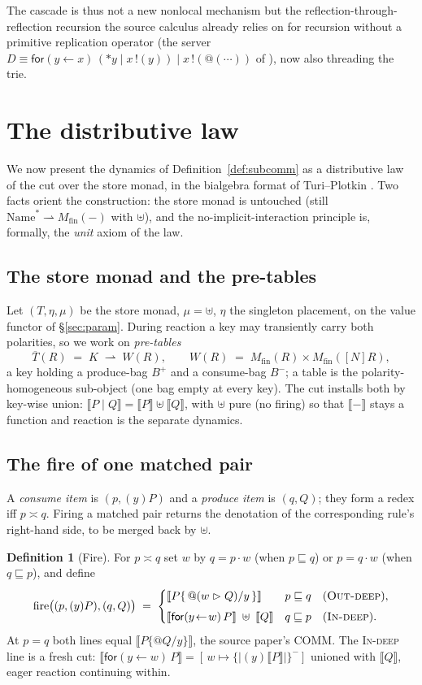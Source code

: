 \documentclass[11pt]{article}
\makeatletter
\theoremstyle{plain}
\theoremstyle{definition}
\newtheorem{definition}{Definition}
\newcommand{\den}[1]{\llbracket #1 \rrbracket}
\newcommand{\Name}{\mathrm{Name}}
\newcommand{\Mfin}{M_{\mathrm{fin}}}
\newcommand{\rfor}[2]{\mathsf{for}(#1\!\leftarrow\!#2)\,}
\newcommand{\rout}[2]{#1\,!(#2)}
\newcommand{\comp}{\mathrel{\asymp}}            %
\newcommand{\loc}{\mathrel{\rhd}}               %
\newcommand{\quo}{@}
\newcommand{\der}{{\ast}}
\newcommand{\rr}{\rightharpoonup}
\makeatother
\begin{document}
The cascade is thus not a new nonlocal mechanism but the reflection-through-reflection recursion the
source calculus already relies on for recursion without a primitive replication operator (the server
$D\equiv\rfor{y}{x}(\der y\mid\rout{x}{y})\mid\rout{x}{\quo(\cdots)}$ of \cite{KnotRho}), now also
threading the trie.

\section{The distributive law}\label{sec:dist}

We now present the dynamics of Definition~\ref{def:subcomm} as a distributive law of the cut over the
store monad, in the bialgebra format of Turi--Plotkin \cite{TP97}. Two facts orient the construction:
the store monad is untouched (still $\Name^{\ast}\rr\Mfin(-)$ with $\uplus$), and the no-implicit-interaction
principle is, formally, the \emph{unit} axiom of the law.

\subsection{The store monad and the pre-tables}

Let $(T,\eta,\mu)$ be the store monad, $\mu=\uplus$, $\eta$ the singleton placement, on the value
functor of \S\ref{sec:param}. During reaction a key may transiently carry both polarities, so we work
on \emph{pre-tables}
\[
  \overline T(R)\;=\;K\;\rr\;W(R),
  \qquad
  W(R)\;=\;\Mfin(R)\times\Mfin([N]R),
\]
a key holding a produce-bag $B^{+}$ and a consume-bag $B^{-}$; a table is the polarity-homogeneous
sub-object (one bag empty at every key). The cut installs both by key-wise union: $\den{P\mid Q}=
\den P\uplus\den Q$, with $\uplus$ pure (no firing) so that $\den{-}$ stays a function and reaction is
the separate dynamics.

\subsection{The fire of one matched pair}

A \emph{consume item} is $(p,(y)P)$ and a \emph{produce item} is $(q,Q)$; they form a redex iff
$p\comp q$. Firing a matched pair returns the denotation of the corresponding rule's right-hand side,
to be merged back by $\uplus$.

\begin{definition}[Fire]\label{def:fire}
For $p\comp q$ set $w$ by $q=p\cdot w$ (when $p\sqsubseteq q$) or $p=q\cdot w$ (when $q\sqsubseteq p$),
and define
\[
  \mathrm{fire}\bigl((p,(y)P),(q,Q)\bigr)\;=\;
  \begin{cases}
    \den{P\{\,\quo(w\loc Q)/y\,\}} & p\sqsubseteq q \quad(\textsc{Out-deep}),\\[4pt]
    \den{\rfor{y}{w}P}\;\uplus\;\den{Q} & q\sqsubseteq p \quad(\textsc{In-deep}).
  \end{cases}
\]
At $p=q$ both lines equal $\den{P\{\quo Q/y\}}$, the source paper's COMM. The \textsc{In-deep} line is
a fresh cut: $\den{\rfor{y}{w}P}=[\,w\mapsto\{\!|(y)\den P|\!\}^{-}]$ unioned with $\den Q$, eager
reaction continuing within.
\end{definition}
\end{document}
